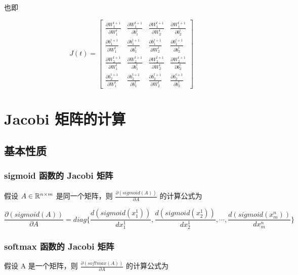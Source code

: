 \documentclass[12pt,a4paper]{amsart}
\begin{document}
也即

\begin{equation}
	J(t) = \begin{bmatrix}
		\frac{\partial W_1^{t+1}}{\partial W_1^t} & \frac{\partial W_1^{t+1}}{\partial b_1^t} & \frac{\partial W_1^{t+1}}{\partial W_2^t} & \frac{\partial W_1^{t+1}}{\partial b_2^t} \\
		\frac{\partial b_1^{t+1}}{\partial W_1^t} & \frac{\partial b_1^{t+1}}{\partial b_1^t} & \frac{\partial b_1^{t+1}}{\partial W_2^t} & \frac{\partial b_1^{t+1}}{\partial b_2^t} \\
		\frac{\partial W_2^{t+1}}{\partial W_1^t} & \frac{\partial W_2^{t+1}}{\partial b_1^t} & \frac{\partial W_2^{t+1}}{\partial W_2^t} & \frac{\partial W_2^{t+1}}{\partial b_2^t} \\
		\frac{\partial b_2^{t+1}}{\partial W_1^t} & \frac{\partial b_2^{t+1}}{\partial b_1^t} & \frac{\partial b_2^{t+1}}{\partial W_2^t} & \frac{\partial b_2^{t+1}}{\partial b_2^t}
	\end{bmatrix}
\end{equation}

\section{Jacobi 矩阵的计算}

\subsection{基本性质}

\subsubsection{sigmoid 函数的 Jacobi 矩阵}

假设 $A \in \mathbb{R}^{n\times m}$ 是同一个矩阵，则 $\frac{\partial (sigmoid(A))}{\partial A}$ 的计算公式为

\begin{equation}
	\frac{\partial (sigmoid(A))}{\partial A} = diag\{\frac{d (sigmoid(x_1^1))}{d x_1^1}, \frac{d (sigmoid(x_2^1))}{d x_2^1}, \cdots, \frac{d (sigmoid(x_m^n))}{d x_m^n} \}
\end{equation}
	
\subsubsection{softmax 函数的 Jacobi 矩阵}

假设 A 是一个矩阵，则 $\frac{\partial (softmax(A))}{\partial A}$ 的计算公式为
\end{document}
